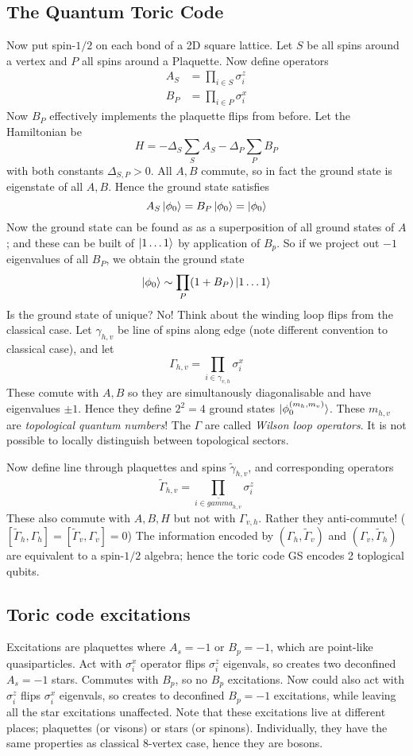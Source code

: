 \documentclass[a4paper]{article}
\begin{document}
\subsection{The Quantum Toric Code}
Now put spin-$1/2$ on each bond of a 2D square lattice. Let $S$ be all spins
around a vertex and $P$ all spins around a Plaquette. Now define operators
\begin{align*}
    A_S&=\prod_{i\in S} \sigma_{i}^z\\
    B_P&=\prod_{i\in P} \sigma_i^x
\end{align*}
Now $B_P$ effectively implements the plaquette flips from before. Let the
Hamiltonian be
\[
    H=-\Delta_S\sum_S A_S - \Delta_P\sum_P B_P
\]
with both constants $\Delta_{S,P}>0$. All $A,B$ commute, so in fact the ground
state is eigenstate of all $A,B$. Hence the ground state satisfies
\[
    A_S\ket{\phi_0}=B_P\ket{\phi_0}=\ket{\phi_0}
\]
Now the ground state can be found as as a superposition of all ground states of
$A$; and these can be built of $\ket{1\dots1}$ by application of $B_p$. So if we
project out $-1$ eigenvalues of all $B_P$, we obtain the ground state
\[
    \ket{\phi_0} \sim \prod_P (1+B_P)\ket{1\dots1}
\]
Is the ground state of unique? No!
Think about the winding loop flips from the classical case. Let $\gamma_{h,v}$
be line of spins along edge (note different convention to classical case), and
let
\[ \Gamma_{h,v}=\prod_{i\in \gamma_{v,h}}\sigma_i^x\]
These comute with $A,B$ so they are simultanously diagonalisable and have
eigenvalues $\pm 1$. Hence they define $2^2=4$ ground states
$\ket{\phi_0^{(m_h,m_v)}}$. These $m_{h,v}$ are \emph{topological quantum
numbers}! The $\Gamma$ are called \emph{Wilson loop operators}. It is not
possible to locally distinguish between topological sectors.

Now define line through plaquettes and spins $\tilde{\gamma}_{h,v}$, and
corresponding operators
\[\tilde{\Gamma}_{h,v}=\prod_{i\in \tilde{gamma}_{h,v}}\sigma_i^z\]
These also commute with $A,B,H$ but not with $\Gamma_{v,h}$. Rather they
anti-commute! ($[\tilde{\Gamma}_h,\Gamma_h]=[\tilde{\Gamma}_v,\Gamma_v]=0$)
The information
encoded by
$(\Gamma_h,\tilde{\Gamma}_v)$ and $(\Gamma_{v},\tilde{\Gamma}_h)$ are equivalent
to a spin-$1/2$ algebra; hence the toric code GS encodes 2 toplogical qubits.
\subsection{Toric code excitations}
Excitations are plaquettes where $A_s=-1$ or $B_p=-1$, which are point-like
quasiparticles. Act with $\sigma^x_i$ operator flips $\sigma_i^z$  eigenvals, so
creates two deconfined $A_s=-1$ stars. Commutes with $B_p$, so no $B_p$
excitations. Now could also act with $\sigma_i^z$ flips $\sigma_i^x$ eigenvals,
so creates to deconfined $B_p=-1$ excitations, while leaving all the star
excitations unaffected. Note that these excitations live at different places;
plaquettes (or visons) or stars (or spinons).  Individually, they have the same
properties as classical 8-vertex case, hence they are bosons. 
\end{document}
